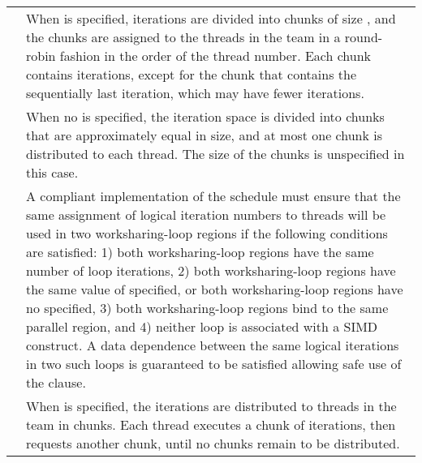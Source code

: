 \tablefirsthead{%
\hline\\[-3ex]
}
\tablelasttail{\hline}
\begin{supertabular}{ p{0.8in} p{4.3in} }
{} & When {\scode{)}} is specified, iterations are divided
into chunks of size {}, and the chunks are assigned to the threads in
the team in a round-robin fashion in the order of the thread number.
Each chunk contains {} iterations, except for the 
chunk that contains the sequentially last iteration, which 
may have fewer iterations.\\

 & When no {} is specified, the iteration space is divided into chunks that
are approximately equal in size, and at most one chunk is distributed to each
thread. The size of the chunks is unspecified in this case.\\

 & A compliant implementation of the {} schedule must ensure that the
same assignment of logical iteration numbers to threads will be used in two
worksharing-loop regions if the following conditions are satisfied: 1) both
worksharing-loop regions have
the same number of loop iterations, 2) both worksharing-loop regions have the same value
of {} specified, or both worksharing-loop regions have no {} specified, 3)
both worksharing-loop regions bind to the same parallel region, and 4) neither loop is
associated with a SIMD construct. A data dependence between the same
logical iterations in two such loops is guaranteed to be satisfied allowing safe
use of the {} clause.\\

{} & When {\scode{)}} is specified, the iterations are
distributed to threads in the team in chunks. Each
thread executes a chunk of iterations, then requests another chunk, until no
chunks remain to be distributed. \\


\end{supertabular}
